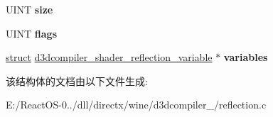 \begin{DoxyCompactItemize}
U\+I\+NT {\bfseries size}
\item 
\mbox{\label{structd3dcompiler__shader__reflection__constant__buffer_a7b3810fc3b5a1989060991af2cb626f7}} 
U\+I\+NT {\bfseries flags}
\item 
\mbox{\label{structd3dcompiler__shader__reflection__constant__buffer_a9a48be0f22433ce9f39f1296a0208888}} 
\hyperlink{interfacestruct}{struct} \hyperlink{structd3dcompiler__shader__reflection__variable}{d3dcompiler\+\_\+shader\+\_\+reflection\+\_\+variable} $\ast$ {\bfseries variables}
\end{DoxyCompactItemize}


该结构体的文档由以下文件生成\+:\begin{DoxyCompactItemize}
\item 
E\+:/\+React\+O\+S-\/0../dll/directx/wine/d3dcompiler\+\_/reflection.\+c\end{DoxyCompactItemize}
